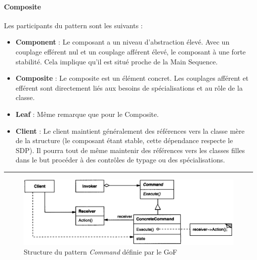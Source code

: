 \documentclass{scrartcl}
\begin{document}
    \paragraph{Composite}Les participants du pattern sont les suivants :
    \begin{itemize}
        \item \textbf{Component} : Le composant a un niveau d'abstraction élevé. Avec un couplage efférent nul et un couplage afférent élevé, le composant à une forte stabilité. Cela implique qu'il est situé proche de la Main Sequence.
        \item \textbf{Composite} : Le composite est un élément concret. Les couplages afférent et efférent sont directement liés aux besoins de spécialisations et au rôle de la classe.
        \item \textbf{Leaf} : Même remarque que pour le Composite.
        \item \textbf{Client} : Le client maintient généralement des références vers la classe mère de la structure (le composant étant stable, cette dépendance respecte le SDP). Il pourra tout de même maintenir des références vers les classes filles dans le but procéder à des contrôles de typage ou des spécialisations.
    \end{itemize}
    
    \vspace{2mm}\hrule
    
    \begin{figure}[H]
        \centering
        \includegraphics[scale=0.35]{img/pattern/command.png}
        \caption{Structure du pattern \emph{Command} définie par le GoF}
    \end{figure}
\end{document}
